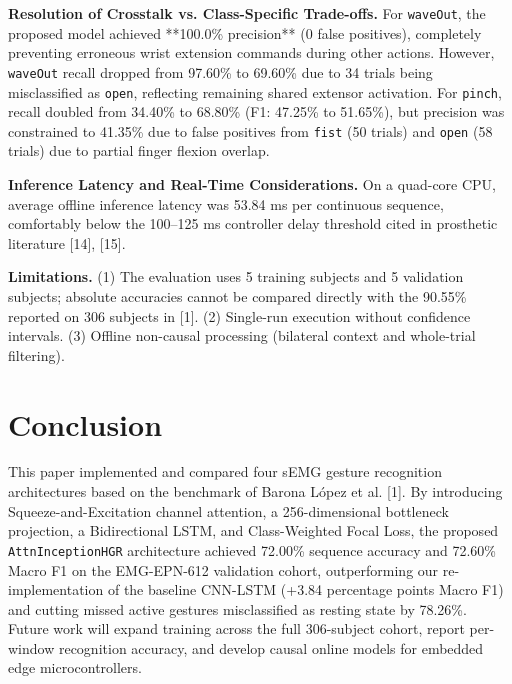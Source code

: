 \documentclass[conference]{IEEEtran}
\begin{document}
\textbf{Resolution of Crosstalk vs. Class-Specific Trade-offs.} For \texttt{waveOut}, the proposed model achieved **100.0\% precision** (0 false positives), completely preventing erroneous wrist extension commands during other actions. However, \texttt{waveOut} recall dropped from 97.60\% to 69.60\% due to 34 trials being misclassified as \texttt{open}, reflecting remaining shared extensor activation. For \texttt{pinch}, recall doubled from 34.40\% to 68.80\% (F1: 47.25\% to 51.65\%), but precision was constrained to 41.35\% due to false positives from \texttt{fist} (50 trials) and \texttt{open} (58 trials) due to partial finger flexion overlap.

\textbf{Inference Latency and Real-Time Considerations.} On a quad-core CPU, average offline inference latency was 53.84 ms per continuous sequence, comfortably below the 100--125 ms controller delay threshold cited in prosthetic literature [14], [15].

\textbf{Limitations.} (1) The evaluation uses 5 training subjects and 5 validation subjects; absolute accuracies cannot be compared directly with the 90.55\% reported on 306 subjects in [1]. (2) Single-run execution without confidence intervals. (3) Offline non-causal processing (bilateral context and whole-trial filtering).

\section{Conclusion}
This paper implemented and compared four sEMG gesture recognition architectures based on the benchmark of Barona L{\'o}pez et al. [1]. By introducing Squeeze-and-Excitation channel attention, a 256-dimensional bottleneck projection, a Bidirectional LSTM, and Class-Weighted Focal Loss, the proposed \texttt{AttnInceptionHGR} architecture achieved 72.00\% sequence accuracy and 72.60\% Macro F1 on the EMG-EPN-612 validation cohort, outperforming our re-implementation of the baseline CNN-LSTM (+3.84 percentage points Macro F1) and cutting missed active gestures misclassified as resting state by 78.26\%. Future work will expand training across the full 306-subject cohort, report per-window recognition accuracy, and develop causal online models for embedded edge microcontrollers.
\end{document}
